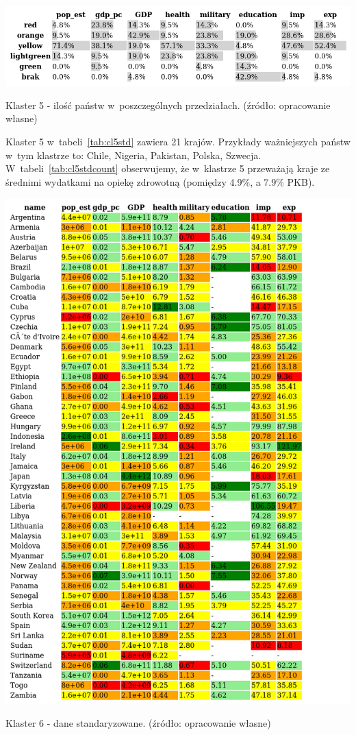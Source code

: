 \documentclass[11pt]{report}
\begin{document}
    \begin{table}[!htp]
        \centering
        \includegraphics[width=\linewidth]{tables/CLUST/cluster5stdkmeanscount.png}
        \caption{Klaster 5 - ilość państw w~poszczególnych przedziałach. (źródło: opracowanie własne)}
        \label{tab:cl5stdcount}
    \end{table}

    Klaster 5 w~tabeli~\ref{tab:cl5std} zawiera 21 krajów.
    Przykłady ważniejszych państw w~tym klastrze to: Chile, Nigeria, Pakistan, Polska, Szwecja.
    W~tabeli~\ref{tab:cl5stdcount} obserwujemy, że w~klastrze 5 przeważają kraje ze średnimi wydatkami na opiekę zdrowotną (pomiędzy 4.9\%, a 7.9\% PKB).

    \begin{table}[!htp]
        \centering
        \includegraphics[width=\linewidth]{tables/CLUST/cluster6stdkmeans.png}
        \caption{Klaster 6 - dane standaryzowane. (źródło: opracowanie własne)}
        \label{tab:cl6std}
    \end{table}
\end{document}
